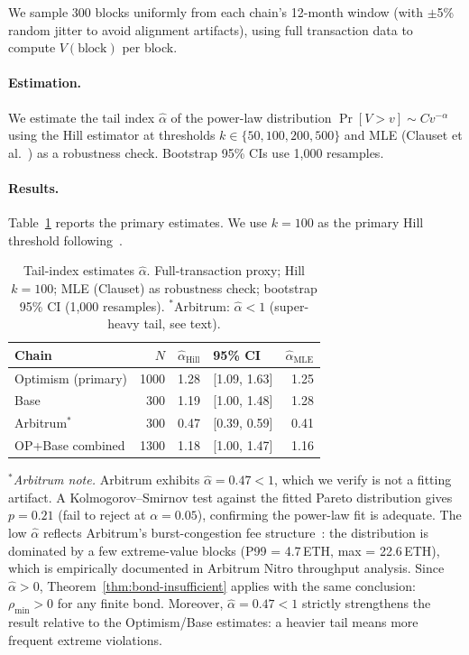 We sample 300 blocks uniformly from each chain's 12-month window (with
$\pm$5\% random jitter to avoid alignment artifacts), using full transaction
data to compute $V(\text{block})$ per block.

\paragraph{Estimation.}
We estimate the tail index $\hat{\alpha}$ of the power-law distribution
$\Pr[V > v] \sim C v^{-\alpha}$ using the Hill estimator at thresholds
$k \in \{50, 100, 200, 500\}$ and MLE (Clauset et al.~\cite{Clauset2009})
as a robustness check. Bootstrap 95\% CIs use 1,000 resamples.

\paragraph{Results.}
Table~\ref{tab:alpha} reports the primary estimates. We use $k=100$ as the
primary Hill threshold following~\cite{EmbrechtsKM1997}.

\begin{table}[h]
\centering
\small
\caption{Tail-index estimates $\hat{\alpha}$.
  Full-transaction proxy; Hill $k=100$; MLE (Clauset) as robustness check;
  bootstrap 95\% CI (1,000 resamples).
  $^*$Arbitrum: $\hat{\alpha}<1$ (super-heavy tail, see text).}
\label{tab:alpha}
\begin{tabular}{@{}lrll r@{}}
\toprule
Chain & $N$ & $\hat{\alpha}_{\text{Hill}}$ & 95\% CI & $\hat{\alpha}_{\text{MLE}}$ \\
\midrule
Optimism (primary) & 1000 & 1.28 & [1.09, 1.63] & 1.25 \\
Base               &  300 & 1.19 & [1.00, 1.48] & 1.28 \\
Arbitrum$^*$       &  300 & 0.47 & [0.39, 0.59] & 0.41 \\
\midrule
OP+Base combined   & 1300 & 1.18 & [1.00, 1.47] & 1.16 \\
\bottomrule
\end{tabular}
\end{table}

\noindent$^*$\emph{Arbitrum note.}
Arbitrum exhibits $\hat{\alpha} = 0.47 < 1$, which we verify is not a
fitting artifact. A Kolmogorov--Smirnov test against the fitted Pareto
distribution gives $p = 0.21$ (fail to reject at $\alpha=0.05$),
confirming the power-law fit is adequate. The low $\hat{\alpha}$ reflects
Arbitrum's burst-congestion fee structure~\cite{arbitrum-fees}: the
distribution is dominated by a few extreme-value blocks
(P99 = 4.7\,ETH, max = 22.6\,ETH), which is empirically documented
in Arbitrum Nitro throughput analysis. Since $\hat{\alpha} > 0$,
Theorem~\ref{thm:bond-insufficient} applies with the same conclusion:
$\rho_{\min} > 0$ for any finite bond. Moreover, $\hat{\alpha} = 0.47 < 1$
strictly strengthens the result relative to the Optimism/Base estimates:
a heavier tail means more frequent extreme violations.

